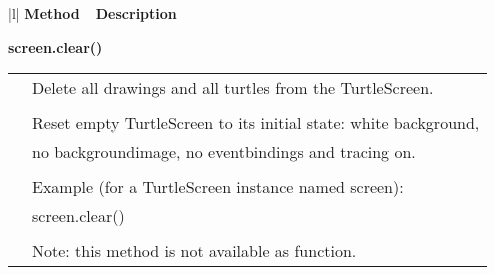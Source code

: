 \begin{center}
{\small
\begin{tabular}{|l|} \hline
{\bf Method~~Description}  \\ \hline\hline 



{\bf    screen.clear()} \\
   \begin{tabular}{p{0.25in}p{4in}}
&        Delete all drawings and all turtles from the TurtleScreen. \\
&  \\
&        Reset empty TurtleScreen to its initial state: white background, \\
&        no backgroundimage, no eventbindings and tracing on. \\
&  \\
&        Example (for a TurtleScreen instance named screen): \\
&        screen.clear() \\
&  \\
&        Note: this method is not available as function. \\
\end{tabular} \\ \hline



\end{tabular}}
\end{center}

